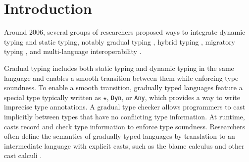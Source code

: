 \documentclass[runningheads]{llncs}
\newcommand{\Tdyn}[0]{\ensuremath{\star}}
\begin{document}
\section{Introduction}
Around 2006, several groups of researchers proposed ways to integrate
dynamic typing and static typing, notably gradual typing
\citep{siek2006gradual}, hybrid typing \citep{knowles2010hybrid},
migratory typing \citep{tobin2006interlanguage}, and multi-language
interoperability \citep{Gray:2005ij,Matthews:2007zr}.


Gradual typing \citep{siek2006gradual,siek2015refined} includes both static typing 
and dynamic typing in the same language and enables a smooth transition between them while
enforcing type soundness.
To enable a smooth transition, gradually typed languages feature a special type
typically written as \Tdyn{}, \lstinline|Dyn|, or \lstinline|Any|, which
provides a way to write imprecise type annotations. A gradual type checker allows programmers to cast 
implicitly between types that have no conflicting type information.
At runtime, casts record and check type information to enforce type soundness.
Researchers often define the semantics of gradually typed languages by
translation to an intermediate language with explicit casts, such as the blame
calculus \citep{wadler2009well} and other cast calculi \citep{siek2009exploring}.
\end{document}
